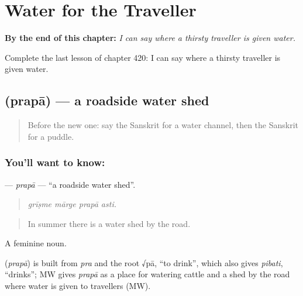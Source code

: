 
\chapter{Water for the Traveller}
\label{ch:sa-water-for-the-traveller}

\begin{chapteropening}
\textbf{By the end of this chapter:} \emph{I can say where a thirsty traveller is given water.}

Complete the last lesson of chapter 420: I can say where a thirsty traveller is given water.
\end{chapteropening}

\section[\texorpdfstring{\sk{प्रपा} (prapā)}{प्रपा (prapā)}]{ (prapā) — a roadside water shed}

\label{lesson:SA-C420-prapa}



\begin{quote}
Before the new one: say the Sanskrit for a water channel, then the Sanskrit for a puddle.
\end{quote}

\subsection*{You'll want to know: }
\textbf{} — \emph{prapā} — \textquotedblleft{}a roadside water shed\textquotedblright{}.

\begin{quote}
   
\end{quote}

\begin{quote}
\emph{grīṣme mārge prapā asti.}
\end{quote}

\begin{quote}
In summer there is a water shed by the road.
\end{quote}

A feminine noun.

\begin{cousinweb}
\textbf{} (\emph{prapā}) is built from \emph{pra} and the root √pā, \textquotedblleft{}to drink\textquotedblright{}, which also gives \emph{pibati}, \textquotedblleft{}drinks\textquotedblright{}; MW gives \emph{prapā} as a place for watering cattle and a shed by the road where water is given to travellers (MW).
\end{cousinweb}

